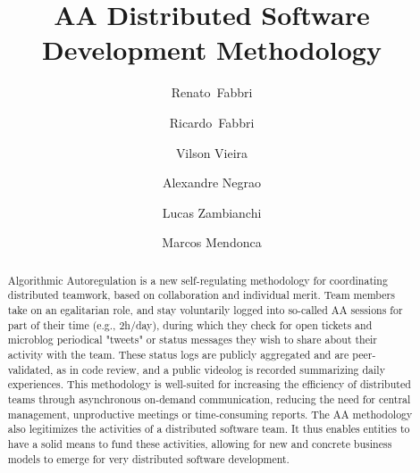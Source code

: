 \title{%
AA Distributed Software Development Methodology
}

\author{%
Renato~Fabbri \and Ricardo~Fabbri \and Vilson Vieira \and Alexandre Negrao \and Lucas Zambianchi
\and Marcos Mendonca
}

\maketitle


\begin{abstract}
Algorithmic Autoregulation is a new self-regulating methodology for coordinating
distributed teamwork,  based on collaboration and
individual merit. Team members take on an egalitarian role, and stay
voluntarily logged into so-called AA sessions for part of their time (e.g.,
2h/day), during which they check for open tickets and microblog periodical
"tweets" or status messages they wish to share about their activity with the
team. These status logs are publicly aggregated and are peer-validated,
as in code review, and a public videolog is recorded summarizing daily experiences.
This methodology is well-suited for increasing the efficiency of distributed
teams through asynchronous on-demand communication, reducing the need for
central management, unproductive meetings or time-consuming reports.  The AA
methodology also legitimizes the activities of a distributed software team.  It
thus enables entities to have a solid means to fund these activities, allowing
for new and concrete business models to emerge for very distributed software
development.  
\end{abstract}

